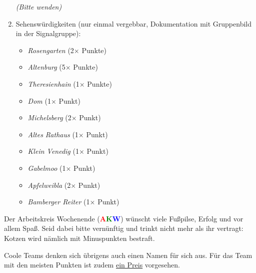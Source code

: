 \documentclass[a5paper,ngerman,xcolor=dvipsnames]{scrartcl}
\begin{document}
\begin{enumerate}
\vspace{1em}
\begin{center}\footnotesize\emph{(Bitte wenden)}\end{center}
\newpage
\item Sehenswürdigkeiten (nur einmal vergebbar, Dokumentation mit Gruppenbild in der Signalgruppe):
    \begin{multicols}{2}
    \begin{itemize}
    \setlength\itemsep{0em}
    \item \emph{Rosengarten} (2$\times$ Punkte)
    \item \emph{Altenburg} (5$\times$ Punkte)
    \item \emph{Theresienhain} (1$\times$ Punkte)
    \item \emph{Dom} (1$\times$ Punkt)
    \item \emph{Michelsberg} (2$\times$ Punkt)
    \item \emph{Altes Rathaus} (1$\times$ Punkt)
    \item \emph{Klein Venedig} (1$\times$ Punkt)
    \item \emph{Gabelmoo} (1$\times$ Punkt)
    \item \emph{Apfelweibla} (2$\times$ Punkt)
    \item \emph{Bamberger Reiter} (1$\times$ Punkt)
    \end{itemize}
    \end{multicols}
\end{enumerate}

Der Arbeitskreis Wochenende
(\textbf{\textcolor{red}{A}\textcolor{green}{K}\textcolor{blue}{W}}) wünscht viele
Fußpilse, Erfolg und vor allem Spaß.  Seid dabei bitte vernünftig und trinkt
nicht mehr als ihr vertragt: Kotzen wird nämlich mit Minuspunkten bestraft.

\vspace{2em}

Coole Teams denken sich übrigens auch einen Namen für sich aus.
Für das Team mit den meisten Punkten ist zudem \ul{ein Preis} vorgesehen.
\end{document}
